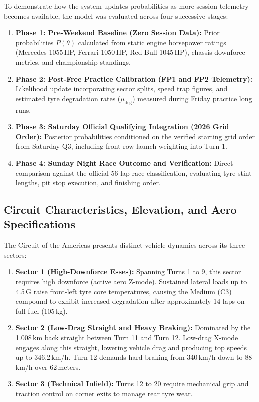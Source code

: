 \documentclass[12pt,a4paper]{report}
\begin{document}
To demonstrate how the system updates probabilities as more session telemetry becomes available, the model was evaluated across four successive stages:
\begin{enumerate}
    \item \textbf{Phase 1: Pre-Weekend Baseline (Zero Session Data):} Prior probabilities $P(\theta)$ calculated from static engine horsepower ratings (Mercedes 1055\,HP, Ferrari 1050\,HP, Red Bull 1045\,HP), chassis downforce metrics, and championship standings.
    \item \textbf{Phase 2: Post-Free Practice Calibration (FP1 and FP2 Telemetry):} Likelihood update incorporating sector splits, speed trap figures, and estimated tyre degradation rates ($\mu_{\text{deg}}$) measured during Friday practice long runs.
    \item \textbf{Phase 3: Saturday Official Qualifying Integration (2026 Grid Order):} Posterior probabilities conditioned on the verified starting grid order from Saturday Q3, including front-row launch weighting into Turn 1.
    \item \textbf{Phase 4: Sunday Night Race Outcome and Verification:} Direct comparison against the official 56-lap race classification, evaluating tyre stint lengths, pit stop execution, and finishing order.
\end{enumerate}

\subsection{Circuit Characteristics, Elevation, and Aero Specifications}
The Circuit of the Americas presents distinct vehicle dynamics across its three sectors:
\begin{enumerate}
    \item \textbf{Sector 1 (High-Downforce Esses):} Spanning Turns 1 to 9, this sector requires high downforce (active aero Z-mode). Sustained lateral loads up to 4.5\,G raise front-left tyre core temperatures, causing the Medium (C3) compound to exhibit increased degradation after approximately 14 laps on full fuel (105\,kg).
    \item \textbf{Sector 2 (Low-Drag Straight and Heavy Braking):} Dominated by the 1.008\,km back straight between Turn 11 and Turn 12. Low-drag X-mode engages along this straight, lowering vehicle drag and producing top speeds up to 346.2\,km/h. Turn 12 demands hard braking from 340\,km/h down to 88\,km/h over 62\,meters.
    \item \textbf{Sector 3 (Technical Infield):} Turns 12 to 20 require mechanical grip and traction control on corner exits to manage rear tyre wear.
\end{enumerate}
\end{document}

